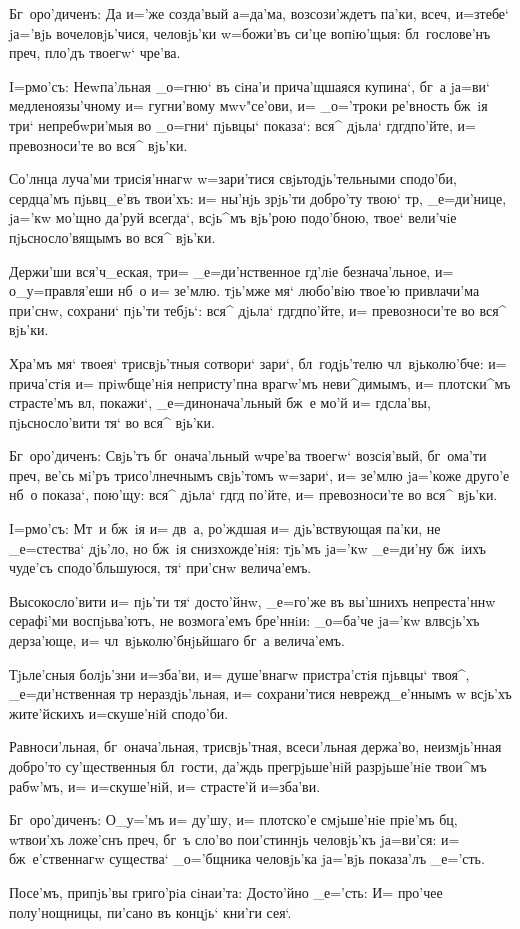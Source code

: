 Бг~оро'диченъ: Да и='же созда'вый а=да'ма, 
возсози'ждетъ па'ки, всеч, и=з\ъ тебе` jа='вjь 
вочеловjь'чися, человjь'ки w=божи'въ си'це вопiю'щыя: 
бл~гослове'нъ преч, пло'дъ твоегw` чре'ва.


I=рмо'съ: Неwпа'льная _о=гню` въ сiна'и прича'щшаяся 
купина`, бг~а jа=ви` медленоязы'чному и= гугни'вому 
мwv"се'ови, и= _о='троки ре'вность бж~iя три` 
непребwри'мыя во _о=гни` пjьвцы` показа`: вся^ дjьла` 
гд гд по'йте, и= превозноси'те во вся^ вjь'ки.

Со'лнца луча'ми трисiя'ннагw w=зари'тися 
свjьтодjь'тельными сподо'би, сердца'мъ пjьвц_е'въ 
твои'хъ: и= ны'нjь зрjь'ти добро'ту твою` тр, 
_е=ди'нице, jа='кw мо'щно да'руй всегда`, всjь^мъ вjь'рою 
подо'бною, твое` вели'чiе пjьсносло'вящымъ во вся^ 
вjь'ки.

Держи'ши вся'ч_еская, тр и= _е=ди'нственное 
гд'лiе безнача'льное, и= о_у=правля'еши нб~о и= 
зе'млю. тjь'мже мя` любо'вiю твое'ю привлачи'ма при'снw, 
сохрани` пjь'ти тебjь`: вся^ дjьла` гд гд по'йте, 
и= превозноси'те во вся^ вjь'ки.

Хра'мъ мя` твоея` трисвjь'тныя сотвори` зари`, 
бл~годjь'телю чл~вjьколю'бче: и= прича'стiя и= 
прiwбще'нiя непристу'пна врагw'мъ неви^димымъ, и= 
плотски^мъ страсте'мъ вл, покажи`, _е=динонача'льный 
бж~е мо'й и= гд сла'вы, пjьсносло'вити тя` во вся^ 
вjь'ки.

Бг~оро'диченъ: Свjь'тъ бг~онача'льный w\т чре'ва 
твоегw` возсiя'вый, бг~ома'ти преч, ве'сь мi'ръ 
трисо'лнечнымъ свjь'томъ w=зари`, и= зе'млю jа='коже 
друго'е нб~о показа`, пою'щу: вся^ дjьла` гд гд 
по'йте, и= превозноси'те во вся^ вjь'ки.


I=рмо'съ: Мт~и бж~iя и= дв~а, ро'ждшая и= 
дjь'вствующая па'ки, не _е=стества` дjь'ло, но бж~iя 
снизхожде'нiя: тjь'мъ jа='кw _е=ди'ну бж~iихъ чуде'съ 
сподо'бльшуюся, тя` при'снw велича'емъ.

Высокосло'вити и= пjь'ти тя` досто'йнw, _е=го'же въ 
вы'шнихъ непреста'ннw серафi'ми воспjьва'ютъ, не 
возмога'емъ бре'ннiи: _о=ба'че jа='кw вл всjь'хъ 
дерза'юще, и= чл~вjьколю'бнjьйшаго бг~а велича'емъ.

Тjьле'сныя болjь'зни и=зба'ви, и= душе'внагw 
пристра'стiя пjьвцы` твоя^, _е=ди'нственная тр 
нераздjь'льная, и= сохрани'тися неврежд_е'ннымъ w\т 
всjь'хъ жите'йскихъ и=скуше'нiй сподо'би.

Равноси'льная, бг~онача'льная, трисвjь'тная, 
всеси'льная держа'во, неизмjь'нная добро'то су'щественныя 
бл~гости, да'ждь прегрjьше'нiй разрjьше'нiе твои^мъ 
рабw'мъ, и= и=скуше'нiй, и= страсте'й и=зба'ви.

Бг~оро'диченъ: О_у='мъ и= ду'шу, и= плотско'е 
смjьше'нiе прiе'мъ бц, w\т твои'хъ ложе'снъ 
преч, бг~ъ сло'во пои'стиннjь человjь'къ jа=ви'ся: 
и= бж~е'ственнагw существа` _о='бщника человjь'ка jа='вjь 
показа'лъ _е='сть.

Посе'мъ, припjь'вы григо'рiа сiнаи'та: Досто'йно 
_е='сть: И= про'чее полу'нощницы, пи'сано въ концjь` 
кни'ги сея`.
